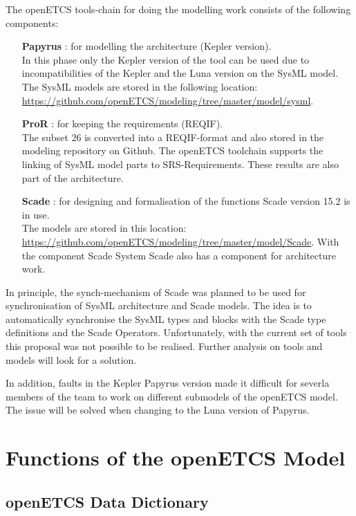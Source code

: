 \documentclass{template/openetcs_article}
\begin{document}
The openETCS tools-chain for doing the modelling work consists of the following components:
\begin{itemize}
	\item [\textbf{Papyrus}]: for modelling the architecture (Kepler version).\\
	In this phase only the Kepler version of the tool can be used due to incompatibilities of the Kepler and the Luna version on the SysML model. The SysML models are stored in the following location: \url{https://github.com/openETCS/modeling/tree/master/model/sysml}.
	\item [\textbf{ProR}]: for keeping the requirements (REQIF).\\
	The subset 26 is converted into a REQIF-format and also stored in the modeling repository on Github. The openETCS toolchain supports the linking of SysML model parts to SRS-Requirements. These results are also part of the architecture.
	\item [\textbf{Scade}]: for designing and formalisation of the functions Scade version 15.2 is in use.\\
	The models are stored in this location: \url{https://github.com/openETCS/modeling/tree/master/model/Scade}.
	With the component Scade System Scade also has a component for architecture work.

\end{itemize}

In principle, the synch-mechanism of Scade was planned to be used for synchronisation of SysML architecture and Scade models. The idea is to automatically synchronise the SysML types and blocks with the Scade type definitions and the Scade Operators. Unfortunately, with the current set of tools this proposal was not possible to be realised. Further analysis on tools and models will look for a solution. 

In addition, faults  in the Kepler Papyrus version made it difficult for severla members of the team to work on different submodels of the openETCS model. The issue will be solved when changing to the Luna version of Papyrus.



\section{Functions of the openETCS Model}

\subsection{openETCS Data Dictionary}
\end{document}
